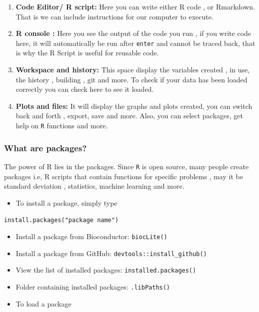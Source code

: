 \documentclass[
]{book}
\providecommand{\tightlist}{%
  \setlength{\itemsep}{0pt}\setlength{\parskip}{0pt}}
\begin{document}
\begin{enumerate}
\def\labelenumi{\arabic{enumi}.}
\item
  \textbf{Code Editor/ R script:} Here you can write either R code , or Rmarkdown. That is we can include instructions for our computer to execute.
\item
  \textbf{R console :} Here you see the output of the code you run , if you write code here, it will automatically be run after \texttt{enter} and cannot be traced back, that is why the R Script is useful for reusable code.
\item
  \textbf{Workspace and history: } This space display the variables created , in use, the history , building , git and more. To check if your data has been loaded correctly you can check here to see it loaded.
\item
  \textbf{Plots and files: } It will display the graphs and plots created, you can switch back and forth , export, save and more. Also, you can select packages, get help on \texttt{R} functions and more.
\end{enumerate}

\subsubsection*{What are packages?}\label{what-are-packages}

The power of R lies in the packages. Since \texttt{R} is open source, many people create packages i.e, R scripts that contain functions for specific problems , may it be standard deviation , statistics, machine learning and more.

\begin{itemize}
\tightlist
\item
  To install a package, simply type
\end{itemize}

\texttt{install.packages("package\ name")}

\begin{itemize}
\item
  Install a package from Bioconductor: \texttt{biocLite()}
\item
  Install a package from GitHub: \texttt{devtools::install\_github()}
\item
  View the list of installed packages: \texttt{installed.packages()}
\item
  Folder containing installed packages: \texttt{.libPaths()}
\item
  To load a package
\end{itemize}
\end{document}
